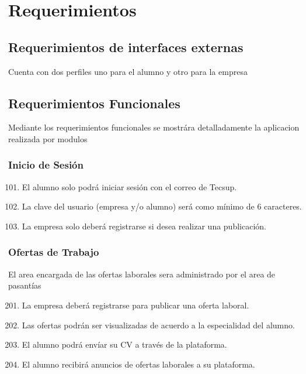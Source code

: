 \chapter{Requerimientos}
\section{Requerimientos de interfaces externas}
Cuenta con dos perfiles uno para el alumno y otro para la empresa

\section{Requerimientos Funcionales}

Mediante los requerimientos funcionales se mostrára detalladamente la aplicacion realizada por modulos

\subsection{Inicio de Sesión}
\begin{flushright}
	\begin{enumerate}
		\setcounter{enumi}{100}
		\item El alumno solo podrá iniciar sesión con el correo de Tecsup.
		\item La clave del usuario (empresa y/o alumno) será como mínimo de 6 caracteres.
		\item La empresa solo deberá registrarse si desea realizar una publicación.
		
	\end{enumerate}
\end{flushright}
\subsection{Ofertas de Trabajo}
El area encargada de las ofertas laborales sera administrado por el area de pasantías
\begin{flushright}
	\begin{enumerate}
		\setcounter{enumi}{200}
		\item La empresa deberá registrarse para publicar una oferta laboral.
		\item Las ofertas podrán ser visualizadas de acuerdo a la especialidad del alumno.
		\item El alumno podrá envíar su CV a través de la plataforma.
		\item El alumno recibirá anuncios de ofertas laborales a su plataforma.
	\end{enumerate}
\end{flushright}
